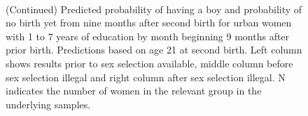 \documentclass[12pt,letterpaper]{article}
\begin{document}
\begin{figure}[htpb]
{\begin{minipage}{0.31\textwidth}
        \captionsetup[subfigure]{labelformat=empty,position=top,captionskip=-1pt,farskip=-0.5pt}
        \\
        \captionsetup[subfigure]{labelformat=parens}
    \end{minipage}
}
\setcounter{subfigure}{6}
\caption{(Continued) Predicted probability of having a boy and probability of
no birth yet from nine months after second birth for urban 
women with 1 to 7 years of education by month beginning 9 months after prior birth. 
Predictions based on age 21 at second birth.
Left column shows results prior to sex selection available, middle column before
sex selection illegal and right column after sex selection illegal.
N indicates the number of women in the relevant group in the underlying samples.
}
\end{figure}
\end{document}
